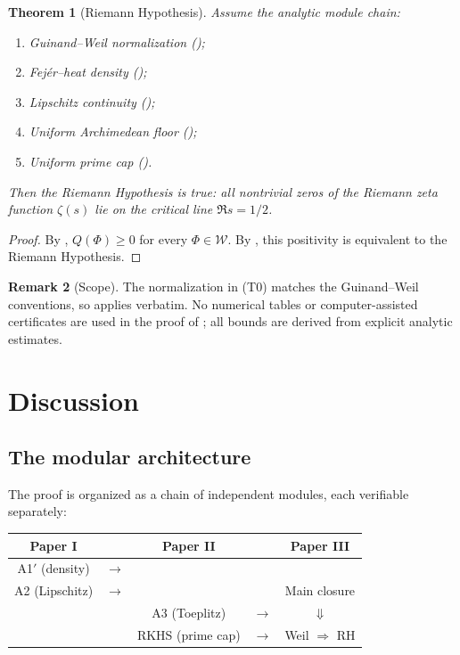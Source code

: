 \documentclass[11pt,a4paper]{article}
\newtheorem{theorem}{Theorem}[section]
\theoremstyle{definition}
\newtheorem{remark}[theorem]{Remark}
\newcommand{\WW}{\mathcal{W}}
\begin{document}
\begin{theorem}[Riemann Hypothesis]\label{thm:RH}
Assume the analytic module chain:
\begin{enumerate}
\item[\textup{(T0)}] Guinand--Weil normalization ();
\item[\textup{(A1$'$)}] Fej\'er--heat density ();
\item[\textup{(A2)}] Lipschitz continuity ();
\item[\textup{(A3)}] Uniform Archimedean floor ();
\item[\textup{(RKHS)}] Uniform prime cap ().
\end{enumerate}
Then the Riemann Hypothesis is true: all nontrivial zeros of the Riemann zeta function $\zeta(s)$ lie on the critical line $\Re s = 1/2$.
\end{theorem}

\begin{proof}
By , $Q(\Phi) \ge 0$ for every $\Phi \in \WW$. By , this positivity is equivalent to the Riemann Hypothesis.
\end{proof}

\begin{remark}[Scope]
The normalization in (T0) matches the Guinand--Weil conventions, so  applies verbatim. No numerical tables or computer-assisted certificates are used in the proof of ; all bounds are derived from explicit analytic estimates.
\end{remark}

\section{Discussion}\label{sec:discussion}

\subsection{The modular architecture}

The proof is organized as a chain of independent modules, each verifiable separately:

\begin{center}
\begin{tabular}{ccccc}
\textbf{Paper I} & & \textbf{Paper II} & & \textbf{Paper III} \\
\hline
A1$'$ (density) & $\longrightarrow$ & & & \\
A2 (Lipschitz) & $\longrightarrow$ & & & Main closure \\
& & A3 (Toeplitz) & $\longrightarrow$ & $\Downarrow$ \\
& & RKHS (prime cap) & $\longrightarrow$ & Weil $\Rightarrow$ RH
\end{tabular}
\end{center}
\end{document}
